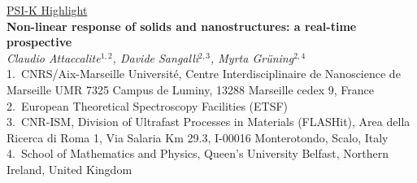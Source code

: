 \documentclass[preprint,showpacs,prb,superscriptaddress,aps,floatfix]{revtex4-1}
\renewcommand{\baselinestretch}{1.2}
\newcommand{\clearemptydoublepage}{\newpage{\pagestyle{empty}\cleardoublepage}}
\renewcommand{\[}{\left[}
\renewcommand{\]}{\right]}
\renewcommand{\(}{\left(}
\renewcommand{\)}{\right)}
\renewcommand{\[}{\left[}
\renewcommand{\]}{\right]}
\renewcommand{\(}{\left(}
\renewcommand{\)}{\right)}
\begin{document}
\pagestyle{empty}

\begin{center}

\begin{figure}
\hspace{2cm}
\end{figure}
\vspace{-2cm}
\Large{\underline{PSI-K Highlight}}\\
\vspace{1cm}
\LARGE{
	{\bf Non-linear response of solids and nanostructures: a real-time prospective}}\\[0.2cm]
\Large{\it Claudio Attaccalite$^{1,2}$, Davide Sangalli$^{2,3}$, Myrta Gr\"uning$^{2,4}$}\\[1cm]
	\small{
1.~CNRS/Aix-Marseille Universit\'e, Centre Interdisciplinaire de Nanoscience de Marseille
UMR 7325 Campus de Luminy, 13288 Marseille cedex 9, France\\
2.~European Theoretical Spectroscopy Facilities (ETSF) \\  
3.~CNR-ISM, Division of Ultrafast Processes in Materials (FLASHit), Area della Ricerca
di Roma 1, Via Salaria Km 29.3, I-00016 Monterotondo, Scalo, Italy \\
	4.~School of Mathematics and Physics, Queen’s University Belfast, Northern Ireland, United Kingdom}
\end{center}


\clearemptydoublepage


\pagestyle{plain}

\setcounter{tocdepth}{4}
\renewcommand{\baselinestretch}{1.5}
%
\clearemptydoublepage






%

%

%

%

%
\clearemptydoublepage



\end{document}
